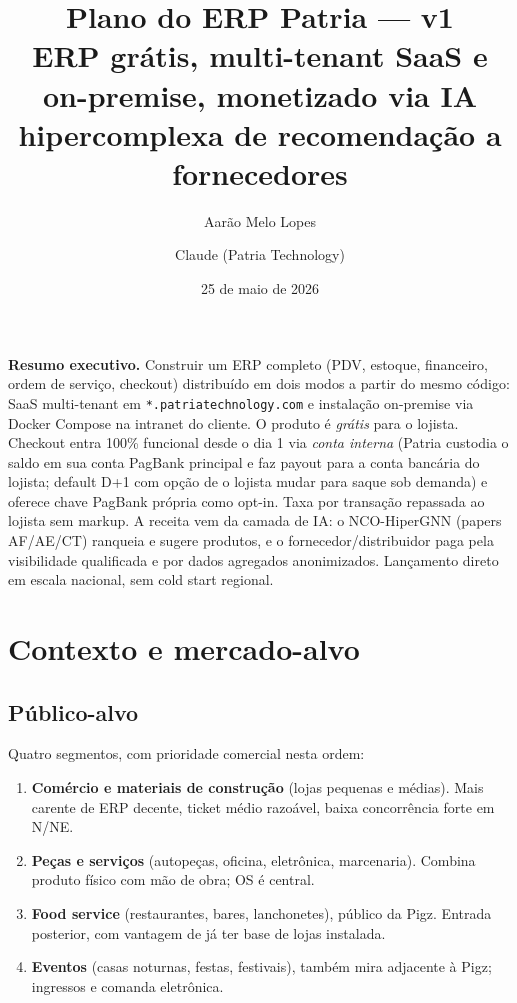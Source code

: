 \documentclass[11pt,a4paper]{article}
\title{\textbf{Plano do ERP Patria --- v1}\\[0.4em]
  \large ERP grátis, multi-tenant SaaS e on-premise,
  monetizado via IA hipercomplexa de recomendação a fornecedores}
\author{Aarão Melo Lopes \and Claude (Patria Technology)}
\date{25 de maio de 2026}
\begin{document}
\maketitle

\begin{notice}
\textbf{Resumo executivo.} Construir um ERP completo (PDV, estoque, financeiro,
ordem de serviço, checkout) distribuído em dois modos a partir do mesmo
código: SaaS multi-tenant em \texttt{*.patriatechnology.com} e instalação
on-premise via Docker Compose na intranet do cliente. O produto é
\emph{grátis} para o lojista. Checkout entra 100\% funcional desde o dia 1
via \emph{conta interna} (Patria custodia o saldo em sua conta PagBank
principal e faz payout para a conta bancária do lojista; default D+1 com
opção de o lojista mudar para saque sob demanda) e oferece chave PagBank
própria como opt-in. Taxa por transação repassada ao lojista sem markup.
A receita vem da camada de IA: o NCO-HiperGNN (papers AF/AE/CT) ranqueia e
sugere produtos, e o fornecedor/distribuidor paga pela visibilidade
qualificada e por dados agregados anonimizados. Lançamento direto em
escala nacional, sem cold start regional.
\end{notice}

\tableofcontents
\newpage

\section{Contexto e mercado-alvo}

\subsection{Público-alvo}

Quatro segmentos, com prioridade comercial nesta ordem:

\begin{enumerate}[leftmargin=2em]
  \item \textbf{Comércio e materiais de construção} (lojas pequenas e médias).
        Mais carente de ERP decente, ticket médio razoável, baixa concorrência
        forte em N/NE.
  \item \textbf{Peças e serviços} (autopeças, oficina, eletrônica, marcenaria).
        Combina produto físico com mão de obra; OS é central.
  \item \textbf{Food service} (restaurantes, bares, lanchonetes), público da
        Pigz. Entrada posterior, com vantagem de já ter base de lojas instalada.
  \item \textbf{Eventos} (casas noturnas, festas, festivais), também mira
        adjacente à Pigz; ingressos e comanda eletrônica.
\end{enumerate}
\end{document}
